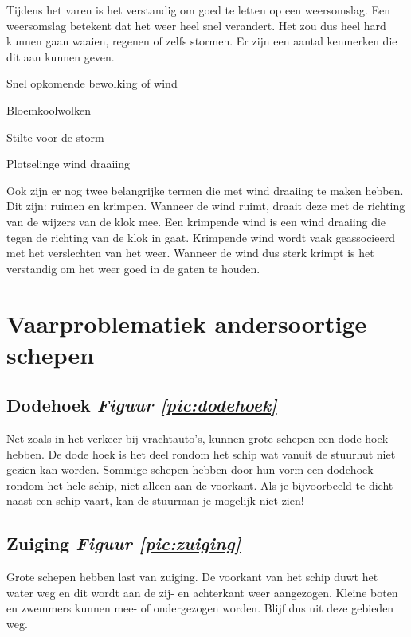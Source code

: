 Tijdens het varen is het verstandig om goed te letten op een weersomslag. Een weersomslag betekent dat het weer heel snel verandert. Het zou dus heel hard kunnen gaan waaien, regenen of zelfs stormen. Er zijn een aantal kenmerken die dit aan kunnen geven. 
\begin{itemize}
    \begin{multicols}{2}
    \item Snel opkomende bewolking of wind
    \item Bloemkoolwolken
    \item Stilte voor de storm
    \item Plotselinge wind draaiing
    \end{multicols}
\end{itemize}
Ook zijn er nog twee belangrijke termen die met wind draaiing te maken hebben. Dit zijn: ruimen en krimpen. Wanneer de wind ruimt, draait deze met de richting van de wijzers van de klok mee. Een krimpende wind is een wind draaiing die tegen de richting van de klok in gaat. Krimpende wind wordt vaak geassocieerd met het verslechten van het weer. Wanneer de wind dus sterk krimpt is het verstandig om het weer goed in de gaten te houden.


\section{Vaarproblematiek andersoortige schepen}
\subsection{Dodehoek \hfill \textit{Figuur \ref{pic:dodehoek}}}
Net zoals in het verkeer bij vrachtauto's, kunnen grote schepen een dode hoek hebben. De dode hoek is het deel rondom het schip wat vanuit de stuurhut niet gezien kan worden. Sommige schepen hebben door hun vorm een dodehoek rondom het hele schip, niet alleen aan de voorkant. Als je bijvoorbeeld te dicht naast een schip vaart, kan de stuurman je mogelijk niet zien!

\subsection{Zuiging \hfill \textit{Figuur \ref{pic:zuiging}}}
Grote schepen hebben last van zuiging. De voorkant van het schip duwt het water weg en dit wordt aan de zij- en achterkant weer aangezogen. Kleine boten en zwemmers kunnen mee- of ondergezogen worden. Blijf dus uit deze gebieden weg.

